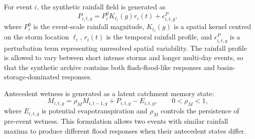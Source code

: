 \documentclass[pdflatex,sn-mathphys-ay]{sn-jnl}
\theoremstyle{thmstyleone}
\begin{document}
For event $i$, the synthetic rainfall field is generated as
\begin{equation}
  P_{i,t,g}
  =
  P^{0}_{i}
  K_{\ell_i}
  \left(
    g
  \right)
  r_i(t)
  +
  \epsilon^{P}_{i,t,g},
  \label{eq:synthetic_precip}
\end{equation}
where $P^{0}_{i}$ is the event-scale rainfall magnitude,
$K_{\ell_i}(g)$ is a spatial kernel centred on the storm location
$\ell_i$, $r_i(t)$ is the temporal rainfall profile, and
$\epsilon^{P}_{i,t,g}$ is a perturbation term representing unresolved
spatial variability.  The rainfall profile is allowed to vary between
short intense storms and longer multi-day events, so that the synthetic
archive contains both flash-flood-like responses and
basin-storage-dominated responses.

Antecedent wetness is generated as a latent catchment memory state:
\begin{equation}
  M_{i,t,g}
  =
  \rho_M M_{i,t-1,g}
  +
  P_{i,t,g}
  -
  E_{i,t,g},
  \qquad
  0<\rho_M<1,
  \label{eq:synthetic_memory}
\end{equation}
where $E_{i,t,g}$ is potential evapotranspiration and $\rho_M$
controls the persistence of pre-event wetness.  This formulation allows
two events with similar rainfall maxima to produce different flood
responses when their antecedent states differ.
\end{document}
